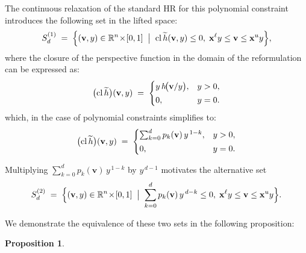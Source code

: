 \documentclass[11pt]{article}
\newtheorem{proposition}{Proposition}
\begin{document}
\begin{appendices}
The continuous relaxation of the standard HR for this polynomial constraint introduces the following set in the lifted space:  
\[
    S_{d}^{(1)}
    \;=\;
    \Bigl\{
        (\mathbf v,y)\in\mathbb R^{n}\!\times\![0,1]
        \;\bigm|\;
        \operatorname{cl}\widetilde h(\mathbf v,y)\le 0,
        \;
        \mathbf x^{\ell}y\le\mathbf v\le \mathbf x^{u}y
    \Bigr\},
\]
where the closure of the perspective function in the domain of the reformulation can be expressed as:  
\begingroup
\begin{equation*}
\setlength{\jot}{0pt}
\begin{aligned}
    \bigl(\operatorname{cl}\widetilde h\bigr)(\mathbf v,y)
    \;=\;
    \begin{cases}
        y\,h\!\bigl(\mathbf v/y\bigr), & y>0,\\[2pt]
        0, & y=0.
    \end{cases}
\end{aligned}
\end{equation*}
\endgroup
which, in the case of polynomial constraints simplifies to:
\begingroup
\begin{equation*}
\setlength{\jot}{0pt}
\begin{aligned}
    \bigl(\operatorname{cl}\widetilde h\bigr)(\mathbf v,y)
    \;=\;
    \begin{cases}
    \sum_{k=0}^{d} p_k(\mathbf v)\,y^{\,1-k}, & y>0,\\[2pt]
        0, & y=0.
    \end{cases}
\end{aligned}
\end{equation*}
\endgroup



Multiplying  \( \sum_{k=0}^{d} p_k(\mathbf v)\,y^{\,1-k}\) by $y^{\,d-1}$  motivates the alternative set
\[
    S_{d}^{(2)}
    \;=\;
    \Bigl\{
        (\mathbf v,y)\in\mathbb R^{n}\!\times\![0,1]
        \;\bigm|\;
        \sum_{k=0}^{d} p_k(\mathbf v)\,y^{\,d-k}\le 0,
        \;
        \mathbf x^{\ell}y\le \mathbf v\le \mathbf x^{u}y
    \Bigr\}.
\]

We demonstrate the equivalence of these two sets in the following proposition:


\begin{proposition}\label{prop:poly-sets}


\end{proposition}
\end{appendices}
\end{document}
